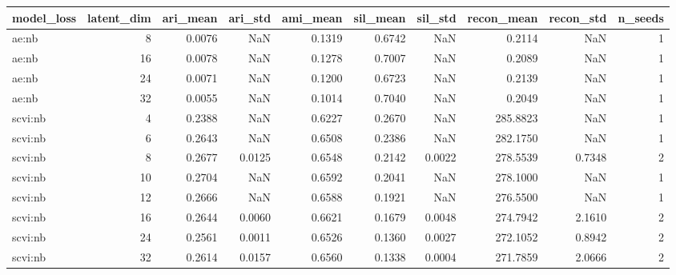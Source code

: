 \begin{tabular}{lrrrrrrrrr}
\toprule
model\_loss & latent\_dim & ari\_mean & ari\_std & ami\_mean & sil\_mean & sil\_std & recon\_mean & recon\_std & n\_seeds \\
\midrule
ae:nb & 8 & 0.0076 & NaN & 0.1319 & 0.6742 & NaN & 0.2114 & NaN & 1 \\
ae:nb & 16 & 0.0078 & NaN & 0.1278 & 0.7007 & NaN & 0.2089 & NaN & 1 \\
ae:nb & 24 & 0.0071 & NaN & 0.1200 & 0.6723 & NaN & 0.2139 & NaN & 1 \\
ae:nb & 32 & 0.0055 & NaN & 0.1014 & 0.7040 & NaN & 0.2049 & NaN & 1 \\
scvi:nb & 4 & 0.2388 & NaN & 0.6227 & 0.2670 & NaN & 285.8823 & NaN & 1 \\
scvi:nb & 6 & 0.2643 & NaN & 0.6508 & 0.2386 & NaN & 282.1750 & NaN & 1 \\
scvi:nb & 8 & 0.2677 & 0.0125 & 0.6548 & 0.2142 & 0.0022 & 278.5539 & 0.7348 & 2 \\
scvi:nb & 10 & 0.2704 & NaN & 0.6592 & 0.2041 & NaN & 278.1000 & NaN & 1 \\
scvi:nb & 12 & 0.2666 & NaN & 0.6588 & 0.1921 & NaN & 276.5500 & NaN & 1 \\
scvi:nb & 16 & 0.2644 & 0.0060 & 0.6621 & 0.1679 & 0.0048 & 274.7942 & 2.1610 & 2 \\
scvi:nb & 24 & 0.2561 & 0.0011 & 0.6526 & 0.1360 & 0.0027 & 272.1052 & 0.8942 & 2 \\
scvi:nb & 32 & 0.2614 & 0.0157 & 0.6560 & 0.1338 & 0.0004 & 271.7859 & 2.0666 & 2 \\
\bottomrule
\end{tabular}
